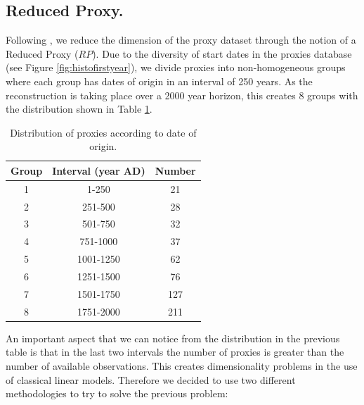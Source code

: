 \documentclass[11pt]{amsart}
\theoremstyle{plain}
\theoremstyle{definition}
\theoremstyle{remark}
\begin{document}
\subsection{Reduced Proxy.}
\label{sec:rp}
Following \cite{Barboza2014}, we reduce the dimension of the proxy dataset
through the notion of a Reduced Proxy ($RP$). Due to the diversity of start
dates in the proxies database (see Figure \ref{fig:histofirstyear}), we divide
proxies into non-homogeneous groups where each group has dates of origin in an
interval of 250 years. As the reconstruction is taking place over a 2000 year
horizon, this creates 8 groups with the distribution shown in Table \ref{tab:distdate}.
\begin{table}
  \centering
  \begin{tabular}{c|c|c}
    \toprule
    Group & Interval (year AD) & Number \\
    \midrule
    1 & 1-250 & 21 \\
    2 & 251-500 & 28 \\
    3 & 501-750 & 32 \\
    4 & 751-1000 & 37 \\
    5 & 1001-1250 & 62 \\
    6 & 1251-1500 & 76 \\
    7 & 1501-1750 & 127 \\
    8 & 1751-2000 & 211 \\
    \bottomrule
  \end{tabular}
  \caption{Distribution of proxies according to date of origin.}
  \label{tab:distdate}
\end{table}
An important aspect that we can notice from the distribution in the previous table is that in the last two intervals the number of proxies is greater than the number of available observations. This creates dimensionality problems in the use of classical linear models. Therefore we decided to use two different methodologies to try to solve the previous problem:
\end{document}
